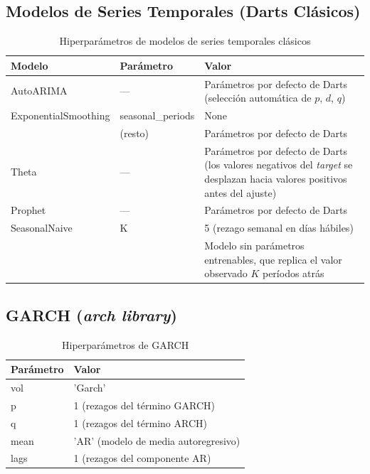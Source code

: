 \subsection{Modelos de Series Temporales (Darts Cl\'asicos)}
\label{app:ts_hyperparams}

\begin{table}[H]
\centering
\caption{Hiperpar\'ametros de modelos de series temporales cl\'asicos}
\label{tab:hyper_ts}
\small
\begin{tabular}{@{}llp{8cm}@{}}
\toprule
\textbf{Modelo} & \textbf{Par\'ametro} & \textbf{Valor} \\
\midrule
AutoARIMA & --- & Par\'ametros por defecto de Darts (selecci\'on autom\'atica de $p$, $d$, $q$) \\
\midrule
ExponentialSmoothing & seasonal\_periods & None \\
 & (resto) & Par\'ametros por defecto de Darts \\
\midrule
Theta & --- & Par\'ametros por defecto de Darts (los valores negativos del \textit{target} se desplazan hacia valores positivos antes del ajuste) \\
\midrule
Prophet & --- & Par\'ametros por defecto de Darts \\
\midrule
SeasonalNaive & K & 5 (rezago semanal en d\'ias h\'abiles) \\
 & & Modelo sin par\'ametros entrenables, que replica el valor observado $K$ per\'iodos atr\'as \\
\bottomrule
\end{tabular}
\end{table}

\subsection{GARCH (\textit{arch library})}
\label{app:garch_hyperparams}

\begin{table}[H]
\centering
\caption{Hiperpar\'ametros de GARCH}
\label{tab:hyper_garch}
\small
\begin{tabular}{@{}lp{10cm}@{}}
\toprule
\textbf{Par\'ametro} & \textbf{Valor} \\
\midrule
vol & 'Garch' \\
p & 1 (rezagos del t\'ermino GARCH) \\
q & 1 (rezagos del t\'ermino ARCH) \\
mean & 'AR' (modelo de media autoregresivo) \\
lags & 1 (rezagos del componente AR) \\
\bottomrule
\end{tabular}
\end{table}

